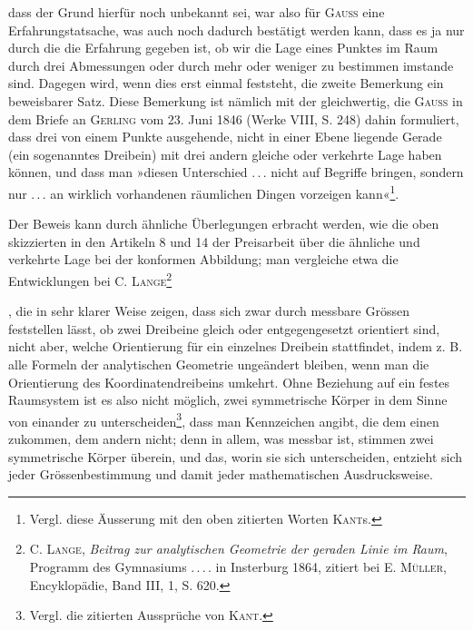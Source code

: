 dass der Grund hierfür noch unbekannt sei, war also für \textsc{Gauss} eine Erfahrungstatsache,
was auch noch dadurch bestätigt werden kann, dass es ja nur durch die
die Erfahrung gegeben ist, ob wir die Lage eines Punktes im Raum durch drei
Abmessungen oder durch mehr oder weniger zu bestimmen imstande sind. Dagegen
wird, wenn dies erst einmal feststeht, die zweite Bemerkung ein beweisbarer
Satz. Diese Bemerkung ist nämlich mit der gleichwertig, die \textsc{Gauss} in dem
Briefe an \textsc{Gerling} vom 23. Juni 1846 (Werke VIII, S. 248) dahin formuliert,
dass drei von einem Punkte ausgehende, nicht in einer Ebene liegende Gerade
(ein sogenanntes Dreibein) mit drei andern gleiche oder verkehrte Lage haben
können, und dass man »diesen Unterschied \mbox{.\,.\,.} nicht auf Begriffe bringen,
sondern nur \mbox{.\,.\,.} an wirklich vorhandenen räumlichen Dingen vorzeigen kann«\footnote{Vergl. diese Äusserung mit den oben zitierten Worten \textsc{Kant}s.}.
\HistoricalFoot{}{23\textsuperscript{*}}
\par\clearpage{}
\noindent Der Beweis kann durch ähnliche Überlegungen erbracht werden, wie die oben
skizzierten in den Artikeln 8 und 14 der Preisarbeit über die ähnliche und
verkehrte Lage bei der konformen Abbildung; man vergleiche etwa die Entwicklungen
bei \textsc{C. Lange}\begingroup\renewcommand{\thefootnote}{270a)}\footnote{\textsc{C. Lange}, \textit{Beitrag zur analytischen Geometrie der geraden Linie im Raum}, Programm des Gymnasiums \mbox{.\,.\,.\,.} in Insterburg 1864, zitiert bei \textsc{E. Müller}, Encyklopädie, Band III, 1, S. 620.}\addtocounter{footnote}{-1}\endgroup, die in sehr klarer Weise zeigen, dass sich zwar
durch messbare Grössen feststellen lässt, ob zwei Dreibeine gleich oder entgegengesetzt
orientiert sind, nicht aber, welche Orientierung für ein einzelnes
Dreibein stattfindet, indem z. B. alle Formeln der analytischen Geometrie ungeändert
bleiben, wenn man die Orientierung des Koordinatendreibeins umkehrt.
Ohne Beziehung auf ein festes Raumsystem ist es also nicht möglich,
zwei symmetrische Körper in dem Sinne von einander zu unterscheiden\footnote{Vergl. die zitierten Aussprüche von \textsc{Kant}.},
dass man Kennzeichen angibt, die dem einen zukommen, dem andern nicht;
denn in allem, was messbar ist, stimmen zwei symmetrische Körper überein,
und das, worin sie sich unterscheiden, entzieht sich jeder Grössenbestimmung
und damit jeder mathematischen Ausdrucksweise.

